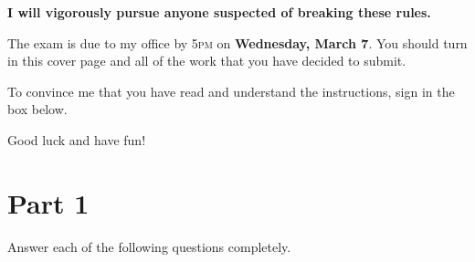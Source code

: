 \documentclass[11pt]{article}
\theoremstyle{definition}
\begin{document}
\begin{center}
\textbf{I will vigorously pursue anyone suspected of breaking these rules.}
\end{center}

\bigskip

The exam is due to my office by 5\textsc{pm} on \textbf{Wednesday, March 7}.  You should turn in this cover page and all of the work that you have decided to submit.

\bigskip

To convince me that you have read and understand the instructions, sign in the box below.

\bigskip


\bigskip

Good luck and have fun!

\newpage

\section*{Part 1}

Answer each of the following questions completely.
\end{document}
